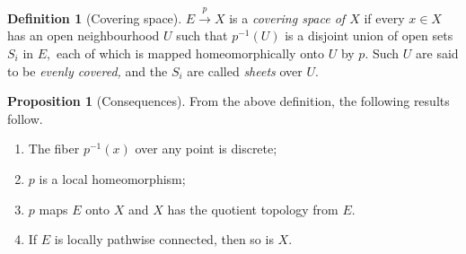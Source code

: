 \documentclass[12pt]{article}
\theoremstyle{definition}
\numberwithin{thm}{section}
\newtheorem{defn}[thm]{Definition}
\newtheorem{prop}[thm]{Proposition}
\begin{document}
\begin{defn}[Covering space]
	$E \overset{p}{\longrightarrow} X$ is a \emph{covering space of $X$} if every $x \in X$ has an open neighbourhood $U$ such that $p^{-1}(U)$ is a disjoint union of open sets $S_i$ in $E,$ each of which is mapped homeomorphically onto $U$ by $p.$ Such $U$ are said to be \emph{evenly covered,} and the $S_i$ are called \emph{sheets} over $U.$
\end{defn}
\begin{prop}[Consequences]
	From the above definition, the following results follow.
	\begin{enumerate}
		\item The fiber $p^{-1}(x)$ over any point is discrete;
		\item $p$ is a local homeomorphism;
		\item $p$ maps $E$ onto $X$ and $X$ has the quotient topology from $E.$
		\item If $E$ is locally pathwise connected, then so is $X.$
	\end{enumerate}
\end{prop}
\end{document}
